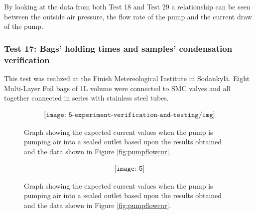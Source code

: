 By looking at the data from both Test 18 and Test 29 a relationship can be seen between the outside air pressure, the flow rate of the pump and the current draw of the pump. 

\subsubsection{Test 17: Bags' holding times and samples' condensation verification}


This test was realized at the Finish Metereological Institute in Sodankyl\"{a}. Eight Multi-Layer Foil bags of 1L volume were connected to SMC valves and all together connected in series with stainless steel tubes. 

\begin{figure}[H]
    \begin{align*}
        \texttt{[image: 5-experiment-verification-and-testing/img]}
    \end{align*}
    \caption {Graph showing the expected current values when the pump is pumping air into a sealed outlet based upon the results obtained and the data shown in Figure \ref{fig:pumpflowcur}.} \label{fig:pumpcurpres}
\end{figure}


\begin{figure}[H]
    \begin{align*}
        \texttt{[image: 5]}
    \end{align*}
    \caption {Graph showing the expected current values when the pump is pumping air into a sealed outlet based upon the results obtained and the data shown in Figure \ref{fig:pumpflowcur}.} \label{fig:pumpcurpres}
\end{figure}


